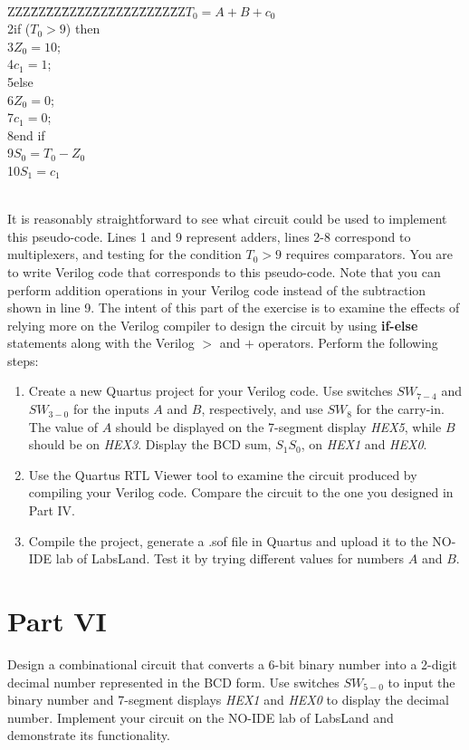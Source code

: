 \documentclass[epsfig,10pt,fullpage]{article}
\newcommand{\CommonDocsPath}{../../../common/docs}
\begin{document}
~\\
\begin{center}
\begin{minipage}[t]{12.5 cm}
\begin{tabbing}
ZZZ\=ZZ\=ZZ\=ZZ\=ZZ\=ZZ\=ZZ\=ZZ\=ZZ\=ZZ\=ZZ\>$T_0 = A + B + c_0$ \\
2\>if ($T_0 > 9$) then\\
3\>\>$Z_0 = 10$;\\
4\>\>$c_1 = 1$;\\
5\>else\\
6\>\>$Z_0 = 0$;\\
7\>\>$c_1 = 0$;\\
8\>end if\\
9\>$S_0 = T_0 - Z_0$\\
10\>$S_1 = c_1$\\
\end{tabbing}
\end{minipage}
\end{center}
~\\
It is reasonably straightforward to see what circuit could be used to implement this
pseudo-code. Lines 1 and 9 represent adders, lines 2-8 correspond to
multiplexers, and testing for the condition $T_0 > 9$ requires comparators.
You are to write Verilog code that corresponds to this pseudo-code. Note that you can
perform addition operations in your Verilog code instead of the subtraction shown 
in line 9. The intent of this part of the exercise is
to examine the effects of relying more on the Verilog compiler to design the circuit by using
{\bf if-else} statements along with the Verilog $>$ and $+$ operators. 
Perform the following steps:

\begin{enumerate}
\item Create a new Quartus project for your Verilog code. Use switches $SW_{7-4}$ and $SW_{3-0}$ for the inputs $A$ and $B$, respectively, and
use $SW_{8}$ for the carry-in.
The value of $A$ should be displayed on the 7-segment display {\it HEX5}, 
while $B$ should be on {\it HEX3}.
Display the BCD sum, $S_1 S_0$, on {\it HEX1} and {\it HEX0}.
\item Use the Quartus RTL Viewer tool to examine the circuit produced by compiling your
Verilog code. Compare the circuit to the one you designed in Part IV.
\item Compile the project, generate a .sof file in Quartus and upload it to the NO-IDE lab of LabsLand. Test it by trying different values for 
numbers $A$ and $B$.
\end{enumerate}

\section*{Part VI}
Design a combinational circuit that converts a 6-bit binary number into 
a 2-digit decimal number represented in the BCD form. 
Use switches $SW_{5-0}$ to input the binary number and 7-segment displays 
{\it HEX1} and {\it HEX0} to display the decimal number.
Implement your circuit on the NO-IDE lab of LabsLand and demonstrate its functionality.


\end{document}
